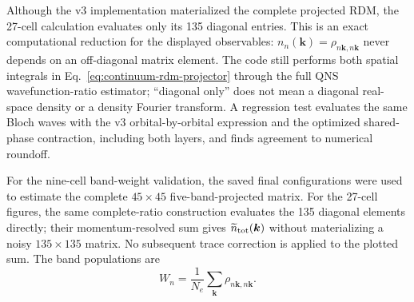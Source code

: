 Although the v3 implementation materialized the complete projected RDM, the
27-cell calculation evaluates only its 135 diagonal entries. This is an exact
computational reduction for the displayed observables:
$n_n(\bm k)=\rho_{n\bm k,n\bm k}$ never depends on an off-diagonal matrix
element. The code still performs both spatial integrals in
Eq.~\eqref{eq:continuum-rdm-projector} through the full QNS wavefunction-ratio
estimator; ``diagonal only'' does not mean a diagonal real-space density or a
density Fourier transform. A regression test evaluates the same Bloch waves
with the v3 orbital-by-orbital expression and the optimized shared-phase
contraction, including both layers, and finds agreement to numerical
roundoff.



For the nine-cell band-weight validation, the saved final configurations were
used to estimate the complete
$45\times45$ five-band-projected matrix. For the 27-cell figures, the same
complete-ratio construction evaluates the 135 diagonal elements directly;
their momentum-resolved sum gives $\widetilde n_{\rm tot}(\bm k)$ without
materializing a noisy $135\times135$ matrix. No subsequent trace correction
is applied to the plotted sum. The band populations are
\begin{equation}
 W_n=\frac1{N_e}\sum_{\bm k}\rho_{n\bm k,n\bm k}.
\end{equation}
